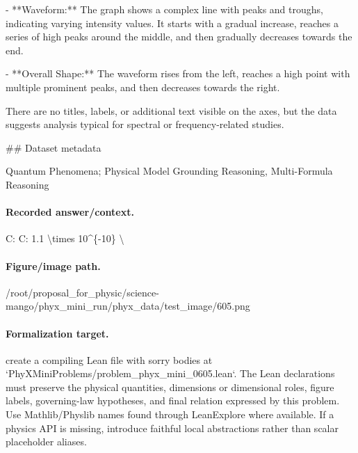 - **Waveform:** The graph shows a complex line with peaks and troughs, indicating varying intensity values. It starts with a gradual increase, reaches a series of high peaks around the middle, and then gradually decreases towards the end.

- **Overall Shape:** The waveform rises from the left, reaches a high point with multiple prominent peaks, and then decreases towards the right.

There are no titles, labels, or additional text visible on the axes, but the data suggests analysis typical for spectral or frequency-related studies.

\#\# Dataset metadata

Quantum Phenomena; Physical Model Grounding Reasoning, Multi-Formula Reasoning

\paragraph{Recorded answer/context.}
C: C: 1.1 \textbackslash{}times 10\textasciicircum{}\{-10\} \textbackslash{}

\paragraph{Figure/image path.}
/root/proposal\_for\_physic/science-mango/phyx\_mini\_run/phyx\_data/test\_image/605.png

\paragraph{Formalization target.}
create a compiling Lean file with sorry bodies at `PhyXMiniProblems/problem\_phyx\_mini\_0605.lean`. The Lean declarations must preserve the physical quantities, dimensions or dimensional roles, figure labels, governing-law hypotheses, and final relation expressed by this problem.
Use Mathlib/Physlib names found through LeanExplore where available. If a physics API is missing, introduce faithful local abstractions rather than scalar placeholder aliases.

